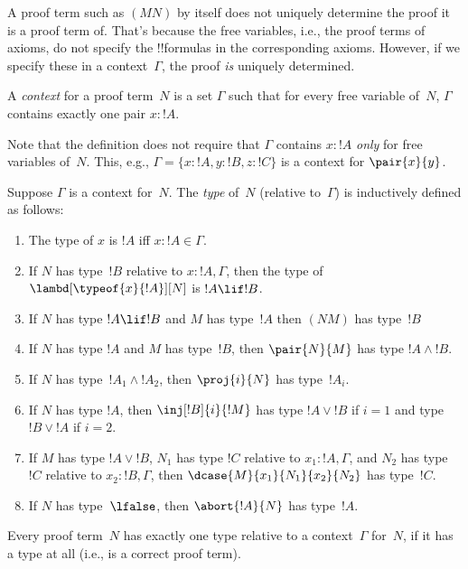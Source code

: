 \documentclass[../../../include/open-logic-section]{subfiles}
\begin{document}


A proof term such as $(MN)$ by itself does not uniquely determine the
proof it is a proof term of. That's because the free variables, i.e.,
the proof terms of axioms, do not specify the !!{formula}s in the
corresponding axioms. However, if we specify these in a
context~$\Gamma$, the proof \emph{is} uniquely determined.

\begin{defn}
A \emph{context} for a proof term~$N$ is a set $\Gamma$ such that for
every free variable of~$N$, $\Gamma$ contains exactly one pair $x : !A$.
\end{defn}

Note that the definition does not require that $\Gamma$ contains
$x:!A$ \emph{only} for free variables of~$N$. This, e.g., $\Gamma =
\{x:!A, y:!B, z:!C\}$ is a context for $\pair{x}{y}$.

\begin{defn}
  Suppose $\Gamma$ is a context for~$N$. The \emph{type} of~$N$
  (relative to~$\Gamma$) is inductively defined as follows:
  \begin{enumerate}
  \item The type of $x$ is $!A$ iff $x:!A \in \Gamma$.
  \item If $N$ has type~$!B$ relative to $x:!A, \Gamma$, then the type of $\lambd[\typeof{x}{!A}][N]$ is $!A \lif !B$.
  \item If $N$ has type $!A \lif !B$ and $M$ has type~$!A$ then $(NM)$
  has type~$!B$
  \item If $N$ has type $!A$ and $M$ has type~$!B$, then $\pair{N}{M}$
  has type $!A \land !B$.
  \item If $N$ has type~$!A_1 \land !A_2$, then $\proj{i}{N}$ has type~$!A_i$.
  \item If $N$ has type $!A$, then
    $\inj[!B]{i}{!M}$ has type $!A \lor !B$ if $i=1$ and type $!B \lor
    !A$ if $i=2$.
  \item If $M$ has type $!A \lor !B$, $N_1$ has type $!C$ relative
  to $x_1:!A, \Gamma$, and $N_2$ has type~$!C$ relative to $x_2:!B,
  \Gamma$, then $\dcase{M}{x_1}{N_1}{x_2}{N_2}$ has type~$!C$.
  \item If $N$ has type~$\lfalse$, then
    $\abort{!A}{N}$ has type~$!A$.
  \end{enumerate}
\end{defn}

\begin{prop}
Every proof term~$N$ has exactly one type relative to a
context~$\Gamma$ for~$N$, if it has a type at all (i.e., is a correct
proof term).
\end{prop}
\end{document}
